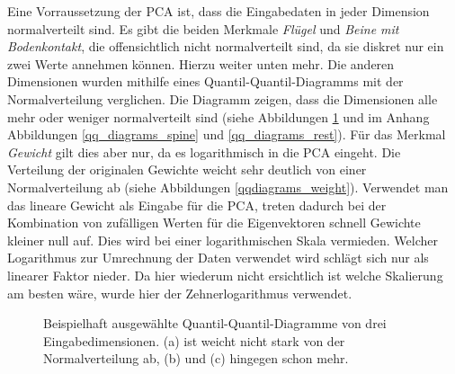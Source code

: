  
 Eine Vorraussetzung der PCA ist, dass die Eingabedaten in jeder Dimension normalverteilt sind. Es gibt die beiden Merkmale \emph{Flügel} und \emph{Beine mit Bodenkontakt}, die offensichtlich nicht normalverteilt sind, da sie diskret nur ein \bzw zwei Werte annehmen können. Hierzu weiter unten mehr. Die anderen Dimensionen wurden mithilfe eines Quantil-Quantil-Diagramms mit der Normalverteilung verglichen. 
 Die Diagramm zeigen, dass die Dimensionen alle mehr oder weniger normalverteilt sind (siehe Abbildungen \ref{qqdiagram_examples} und im Anhang Abbildungen \ref{qq_diagrams_spine} und \ref{qq_diagrams_rest}).
 Für das Merkmal \emph{Gewicht} gilt dies aber nur, da es logarithmisch in die PCA eingeht. Die Verteilung der originalen Gewichte weicht sehr deutlich von einer Normalverteilung ab (siehe Abbildungen \ref{qqdiagrams_weight}).
 Verwendet man das lineare Gewicht als Eingabe für die PCA, treten dadurch bei der Kombination von zufälligen Werten für die Eigenvektoren schnell Gewichte kleiner null auf. Dies wird bei einer logarithmischen Skala vermieden.
 Welcher Logarithmus zur Umrechnung der Daten verwendet wird schlägt sich nur als linearer Faktor nieder. Da hier wiederum nicht ersichtlich ist welche Skalierung am besten wäre, wurde hier der Zehnerlogarithmus verwendet.
 
 \begin{figure}
  \qquad
  \qquad
  
  \caption{Beispielhaft ausgewählte Quantil-Quantil-Diagramme von drei Eingabedimensionen. (a) ist weicht nicht stark von der Normalverteilung ab, (b) und (c) hingegen schon mehr.}
  \label{qqdiagram_examples}
 \end{figure}
 
